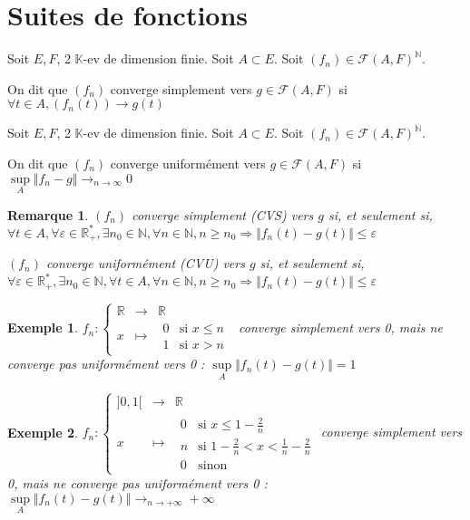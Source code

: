 \documentclass[a4paper,12pt]{book}
\newcommand{\Def}[2]{\begin{tcolorbox}[sharp corners, colback=white,colframe=blue!90!black!75, title=Définition : #1]#2\end{tcolorbox}}
\newtheorem{Exe}{Exemple}[section]
\newtheorem{Rem}{Remarque}[section]
\def\R{\mathbb{R}}
\def\N{\mathbb{N}}
\def\K{\mathbb{K}}
\begin{document}
\section{Suites de fonctions}
\Def{Convergence simple}{Soit $E,F$, 2 $\K$-ev de dimension finie. Soit $A\subset E$. Soit $(f_n)\in\mathcal{F}(A,F)^\N$.
\par On dit que $(f_n)$ converge simplement vers $g\in\mathcal{F}(A,F)$ si $\forall t\in A, (f_n(t))\to g(t)$}
\Def{Convergence uniforme}{Soit $E,F$, 2 $\K$-ev de dimension finie. Soit $A\subset E$. Soit $(f_n)\in\mathcal{F}(A,F)^\N$.
\par On dit que $(f_n)$ converge uniformément vers $g\in\mathcal{F}(A,F)$ si $\sup\limits_{A}\Vert f_n-g\Vert \to_{n\to\infty} 0$}
\begin{Rem}
$(f_n)$ converge simplement (CVS) vers $g$ si, et seulement si, $\forall t\in A, \forall\varepsilon\in\R_+^*, \exists n_0\in\N, \forall n\in\N, n\geq n_0\Rightarrow \Vert f_n(t)-g(t)\Vert\leq\varepsilon$
\par $(f_n)$ converge uniformément (CVU) vers $g$ si, et seulement si, $\forall\varepsilon\in\R_+^*, \exists n_0\in\N, \forall t\in A,\forall n\in\N, n\geq n_0\Rightarrow \Vert f_n(t)-g(t)\Vert\leq\varepsilon$
\end{Rem}
\begin{Exe}
$f_n:\left\{\begin{array}{rcl} \R & \to & \R \\ x & \mapsto & \begin{array}{rl} 0 & \text{si $x\leq n$} \\ 1 & \text{si $x>n$}\end{array}\end{array}\right.$ converge simplement vers 0, mais ne converge pas uniformément vers 0 : $\sup\limits_A \Vert f_n(t)-g(t)\Vert = 1$
\end{Exe}
\begin{Exe}
$f_n:\left\{\begin{array}{rcl} ]0,1[ & \to & \R \\ x & \mapsto & \begin{array}{rl} 0 & \text{si $x\leq 1-\frac{2}{n}$} \\ n & \text{si $1-\frac{2}{n}<x<\frac{1}{n}-\frac{2}{n}$} \\ 0 & \text{sinon}\end{array}\end{array}\right.$converge simplement vers 0, mais ne converge pas uniformément vers 0 : $\sup\limits_A \Vert f_n(t)-g(t)\Vert\to_{n\to+\infty}+\infty$
\end{Exe}
\end{document}
